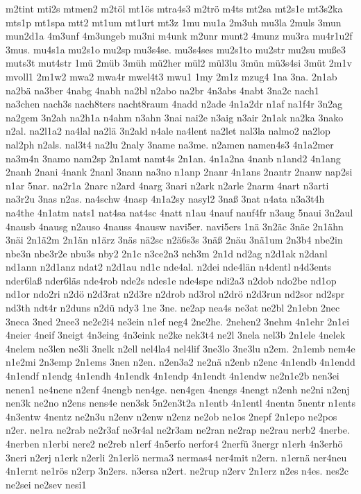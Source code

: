 {m2tint
mti2s
mtmen2
m2töl
mt1ös
mtra4s3
m2trö
m4ts
mt2sa
mt2s1e
mt3s2ka
mts1p
mt1spa
mtt2
mt1um
mt1urt
mt3z
1mu
mu1a
2m3uh
mu3la
2muls
3mun
mun2d1a
4m3unf
4m3ungeb
mu3ni
m4unk
m2unr
munt2
4munz
mu3ra
mu4r1u2f
3mus.
mu4s1a
mu2s1o
mu2sp
mu3s4se.
mu3s4ses
mu2s1to
mu2str
mu2su
muße3
muts3t
mut4str
1mü
2müb
3müh
mü2her
mül2
mül3lu
3mün
mü3s4si
3müt
2m1v
mvoll1
2m1w2
mwa2
mwa4r
mwel4t3
mwu1
1my
2m1z
mzug4
1na
3na.
2n1ab
na2bä
na3ber
4nabg
4nabh
na2bl
n2abo
na2br
4n3abs
4nabt
3na2c
nach1
na3chen
nach3s
nach8ters
nacht8raum
4nadd
n2ade
4n1a2dr
n1af
na1f4r
3n2ag
na2gem
3n2ah
na2h1a
n4ahm
n3ahn
3nai
nai2e
n3aig
n3air
2n1ak
na2ka
3nako
n2al.
na2l1a2
na4lal
na2lä
3n2ald
n4ale
na4lent
na2let
nal3la
nalmo2
na2lop
nal2ph
n2als.
nal3t4
na2lu
2naly
3name
na3me.
n2amen
namen4s3
4n1a2mer
na3m4n
3namo
nam2sp
2n1amt
namt4s
2n1an.
4n1a2na
4nanb
n1and2
4n1ang
2nanh
2nani
4nank
2nanl
3nann
na3no
n1anp
2nanr
4n1ans
2nantr
2nanw
nap2si
n1ar
5nar.
na2r1a
2narc
n2ard
4narg
3nari
n2ark
n2arle
2narm
4nart
n3arti
na3r2u
3nas
n2as.
na4schw
4nasp
4n1a2sy
nasyl2
3naß
3nat
n4ata
n3a3t4h
na4the
4n1atm
nats1
nat4sa
nat4sc
4natt
n1au
4nauf
nauf4fr
n3aug
5naui
3n2aul
4nausb
4nausg
n2auso
4nauss
4nausw
navi5er.
navi5ers
1nä
3n2äc
3näe
2n1ähn
3näi
2n1ä2m
2n1än
n1ärz
3näs
nä2sc
n2ä6s3s
3näß
2näu
3nä1um
2n3b4
nbe2in
nbe3n
nbe3r2e
nbu3s
nby2
2n1c
n3ce2n3
nch3m
2n1d
nd2ag
n2d1ak
n2danl
nd1ann
n2d1anz
ndat2
n2d1au
nd1c
nde4al.
n2dei
nde4län
n4dentl
n4d3ents
nder6laß
nder6läs
nde4rob
nde2s
ndes1e
nde4spe
ndi2a3
n2dob
ndo2be
nd1op
nd1or
ndo2ri
n2dö
n2d3rat
n2d3re
n2drob
nd3rol
n2drö
n2d3run
nd2sor
nd2spr
nd3th
ndt4r
n2duns
n2dü
ndy3
1ne
3ne.
ne2ap
nea4s
ne3at
ne2bl
2n1ebn
2nec
3neca
3ned
2nee3
ne2e2i4
ne3ein
n1ef
neg4
2ne2he.
2nehen2
3nehm
4n1ehr
2n1ei
4neier
4neif
3neigt
4n3eing
4n3eink
ne2ke
nek3t4
ne2l
3nela
nel3b
2n1ele
4nelek
4nelem
ne3len
ne3li
3nelk
n2ell
nel4la4
nel4lif
3ne3lo
3ne3lu
n2em.
2n1emb
nem4e
n1e2mi
2n3emp
2n1ems
3nen
n2en.
n2en3a2
ne2nä
n2enb
n2enc
4n1endb
4n1endd
4n1endf
n1endg
4n1endh
4n1endk
4n1endp
4n1endt
4n1endw
ne2n1e2b
nen3ei
nenen1
ne4nene
n2enf
4nengb
nen4ge.
nen4gen
4nengs
4nengt
n2enh
ne2ni
n2enj
nen3k
ne2no
n2ens
nens4e
nen3sk
5n2en3t2a
n1entb
4n1entl
4nentn
5nentr
n1ents
4n3entw
4nentz
ne2n3u
n2env
n2enw
n2enz
ne2ob
ne1os
2nepf
2n1epo
ne2pos
n2er.
ne1ra
ne2rab
ne2r3af
ne3r4al
ne2r3am
ne2ran
ne2rap
ne2rau
nerb2
4nerbe.
4nerben
n1erbi
nere2
ne2reb
n1erf
4n5erfo
nerfor4
2nerfü
3nergr
n1erh
4n3erhö
3neri
n2erj
n1erk
n2erli
2n1erlö
nerma3
nermas4
ner4mit
n2ern.
n1ernä
ner4neu
4n1ernt
ne1rös
n2erp
3n2ers.
n3ersa
n2ert.
ne2rup
n2erv
2n1erz
n2es
n4es.
nes2c
ne2sei
ne2sev
nesi1
}
